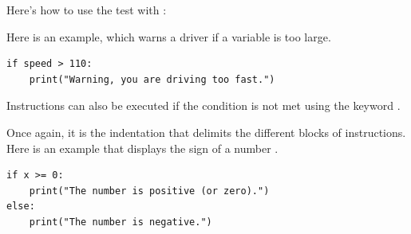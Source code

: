 \documentclass[11pt,class=report,crop=false]{standalone}
\begin{document}




\begin{cours}[If ... then ...]

Here's how to use the \og{}\fg{} test with \Python{}:


Here is an example, which warns a driver if a variable  is too large.
\begin{center}
\begin{minipage}{0.7\textwidth}
\begin{lstlisting}
if speed > 110:
    print("Warning, you are driving too fast.")
\end{lstlisting}
\end{minipage} 
\end{center} 

Instructions can also be executed if the condition is not met using the keyword \og{}\fg{}.


Once again, it is the indentation that delimits the different blocks of instructions.
Here is an example that displays the sign of a number .
\begin{center}
\begin{minipage}{0.5\textwidth}
\begin{lstlisting}
if x >= 0:
    print("The number is positive (or zero).")
else:
    print("The number is negative.")
\end{lstlisting}
\end{minipage} 
\end{center} 


\end{cours}


\end{document}
